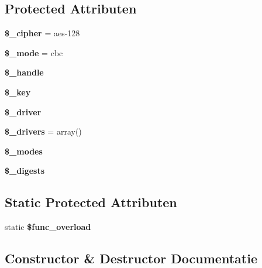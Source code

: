 \subsection*{Protected Attributen}
\begin{DoxyCompactItemize}
\item 
\mbox{\label{class_c_i___encryption_a4e0ebc185eac8850eed1270574032c20}} 
{\bfseries \$\+\_\+cipher} = \textquotesingle{}aes-\/128\textquotesingle{}
\item 
\mbox{\label{class_c_i___encryption_a591b2fac857402b7049ebb2ca47cdd34}} 
{\bfseries \$\+\_\+mode} = \textquotesingle{}cbc\textquotesingle{}
\item 
\mbox{\label{class_c_i___encryption_a8a6371c0c0a9ffce88717aa263edebc7}} 
{\bfseries \$\+\_\+handle}
\item 
\mbox{\label{class_c_i___encryption_a535630cefaf93746423d63a93daa1099}} 
{\bfseries \$\+\_\+key}
\item 
\mbox{\label{class_c_i___encryption_a538d24348271772aa61f8239cc6431dd}} 
{\bfseries \$\+\_\+driver}
\item 
\mbox{\label{class_c_i___encryption_a3734ce50add95d0d78ea9fff6c4ad856}} 
{\bfseries \$\+\_\+drivers} = array()
\item 
{\bfseries \$\+\_\+modes}
\item 
{\bfseries \$\+\_\+digests}
\end{DoxyCompactItemize}
\subsection*{Static Protected Attributen}
\begin{DoxyCompactItemize}
\item 
\mbox{\label{class_c_i___encryption_aef84be58d58a5895572c5689e56a1047}} 
static {\bfseries \$func\+\_\+overload}
\end{DoxyCompactItemize}


\subsection{Constructor \& Destructor Documentatie}
\mbox{\label{class_c_i___encryption_a85ac5b7f54ad67ec6b5b9dc282717602}} 
